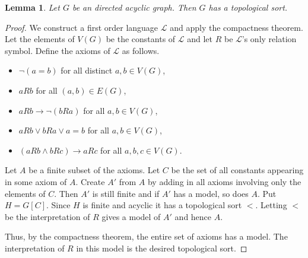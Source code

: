 \documentclass[12pt]{article}
\newtheorem{lem}[thm]{Lemma}
\theoremstyle{remark}
\newcommand{\fancy}[1]{\mathcal{#1}}
\begin{document}
\begin{lem}\label{TopSortExists}
Let $G$ be an directed acyclic graph. Then $G$ has a topological sort.
\end{lem}
\begin{proof}
We construct a first order language $\fancy{L}$ and apply the compactness theorem.  Let the elements of $V(G)$ be the constants of $\fancy{L}$ and let $R$ be $\fancy{L}$'s only relation symbol.  Define the axioms of $\fancy{L}$ as follows.

\begin{itemize}
\item $\neg (a = b)$ for all distinct $a,b \in V(G)$,
\item $aRb$ for all $(a,b) \in E(G)$,
\item $aRb \rightarrow \neg (bRa)$ for all $a,b \in V(G)$,
\item $aRb \vee bRa \vee a = b$ for all $a,b \in V(G)$,
\item $(aRb \wedge bRc) \rightarrow aRc$ for all $a,b,c \in V(G)$.
\end{itemize}

Let $A$ be a finite subset of the axioms.  Let $C$ be the set of all constants appearing in some axiom of $A$.  Create $A'$ from $A$ by adding in all axioms involving only the elements of $C$.  Then $A'$ is still finite and if $A'$ has a model, so does $A$.  Put $H = G[C]$.  Since $H$ is finite and acyclic it has a topological sort $<$.  Letting $<$ be the interpretation of $R$ gives a model of $A'$ and hence $A$.\newline

Thus, by the compactness theorem, the entire set of axioms has a model.  The interpretation of $R$ in this model is the desired topological sort.
\end{proof}
\end{document}
